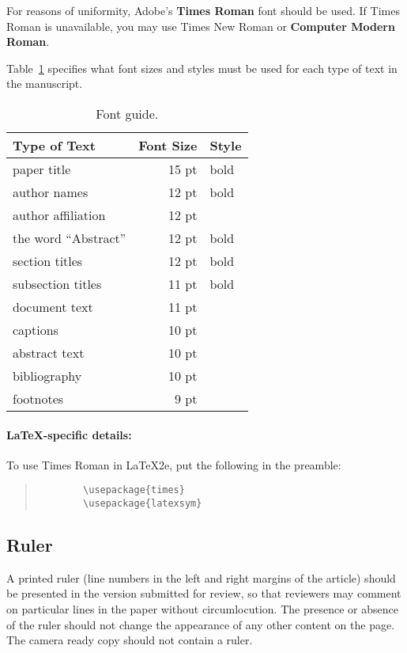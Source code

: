  For reasons of uniformity, Adobe's \textbf{Times Roman} font should be used.
 If Times Roman is unavailable, you may use Times New Roman or \textbf{Computer Modern Roman}.
 
 Table~\ref{font-table} specifies what font sizes and styles must be used for each type of text in the manuscript.
 
 \begin{table}
 	\centering
 	\begin{tabular}{lrl}
 		\hline \textbf{Type of Text} & \textbf{Font Size} & \textbf{Style} \\ \hline
 		paper title & 15 pt & bold \\
 		author names & 12 pt & bold \\
 		author affiliation & 12 pt & \\
 		the word ``Abstract'' & 12 pt & bold \\
 		section titles & 12 pt & bold \\
 		subsection titles & 11 pt & bold \\
 		document text & 11 pt  &\\
 		captions & 10 pt & \\
 		abstract text & 10 pt & \\
 		bibliography & 10 pt & \\
 		footnotes & 9 pt & \\
 		\hline
 	\end{tabular}
 	\caption{\label{font-table} Font guide. }
 \end{table}
 
 \paragraph{\LaTeX-specific details:}
 To use Times Roman in \LaTeX2e{}, put the following in the preamble:
 \begin{quote}
 	\small
 	\begin{verbatim}
 		\usepackage{times}
 		\usepackage{latexsym}
 	\end{verbatim}
 \end{quote}
 
 
 \subsection{Ruler}
 A printed ruler (line numbers in the left and right margins of the article) should be presented in the version submitted for review, so that reviewers may comment on particular lines in the paper without circumlocution.
 The presence or absence of the ruler should not change the appearance of any other content on the page.
 The camera ready copy should not contain a ruler.
 
